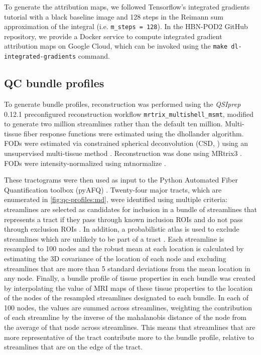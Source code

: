 \documentclass[fleqn,10pt]{wlscirep}
\begin{document}
To generate the attribution maps, we followed Tensorflow's integrated gradients
tutorial \cite{integrated-gradients-tutorial} with a black baseline image and
128 steps in the Reimann sum approximation of the integral (i.e.
\texttt{m\_steps = 128}). In the HBN-POD2 GitHub repository, we provide a Docker
service to compute integrated gradient attribution maps on Google Cloud, which
can be invoked using the \texttt{make dl-integrated-gradients} command.

\subsection*{QC bundle profiles}

To generate bundle profiles, reconstruction was performed using the
\emph{QSIprep} 0.12.1 preconfigured reconstruction workflow
\texttt{mrtrix\_multishell\_msmt}, modified to generate two million streamlines
rather than the default ten million.  Multi-tissue fiber response functions were
estimated using the dhollander algorithm. FODs were estimated via constrained
spherical deconvolution (CSD, \cite{originalcsd, tournier2008csd}) using an
unsupervised multi-tissue method \cite{dhollander2019response,
dhollander2016unsupervised}. Reconstruction was done using MRtrix3
\cite{mrtrix3}. FODs were intensity-normalized using mtnormalize
\cite{mtnormalize}.

These tractograms were then used as input to the Python Automated Fiber
Quantification toolbox (pyAFQ) \cite{kruper2021evaluating}.  Twenty-four major
tracts, which are enumerated in \ref{fig:qc-profiles:md}, were identified using
multiple criteria: streamlines are selected as candidates for inclusion in a
bundle of streamlines that represents a tract if they pass through known
inclusion ROIs and do not pass through exclusion ROIs \cite{Wakana2007-nw}. In
addition, a probabilistic atlas is used to exclude streamlines which are
unlikely to be part of a tract \cite{Hua2008-di}. Each streamline is resampled
to 100 nodes and the robust mean at each location is calculated by estimating
the 3D covariance of the location of each node and excluding streamlines that
are more than 5 standard deviations from the mean location in any node. Finally,
a bundle profile of tissue properties in each bundle was created by
interpolating the value of MRI maps of these tissue properties to the location
of the nodes of the resampled streamlines designated to each bundle. In each of
100 nodes, the values are summed across streamlines, weighting the contribution
of each streamline by the inverse of the mahalanobis distance of the node from
the average of that node across streamlines. This means that streamlines that
are more representative of the tract contribute more to the bundle profile,
relative to streamlines that are on the edge of the tract.
\end{document}
